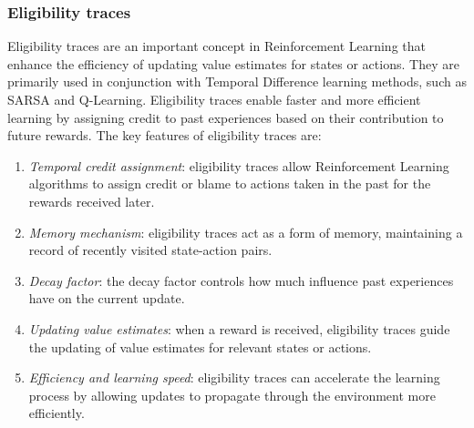 \subsubsection{Eligibility traces}
Eligibility traces are an important concept in Reinforcement Learning that enhance the efficiency of updating value estimates for states or actions. 
They are primarily used in conjunction with Temporal Difference learning methods, such as SARSA and Q-Learning. 
Eligibility traces enable faster and more efficient learning by assigning credit to past experiences based on their contribution to future rewards.
The key features of eligibility traces are:
\begin{enumerate}
    \item \textit{Temporal credit assignment}: eligibility traces allow Reinforcement Learning algorithms to assign credit or blame to actions taken in the past for the rewards received later.
    \item \textit{Memory mechanism}: eligibility traces act as a form of memory, maintaining a record of recently visited state-action pairs.
    \item \textit{Decay factor}: the decay factor controls how much influence past experiences have on the current update.
    \item \textit{Updating value estimates}: when a reward is received, eligibility traces guide the updating of value estimates for relevant states or actions.
    \item \textit{Efficiency and learning speed}: eligibility traces can accelerate the learning process by allowing updates to propagate through the environment more efficiently. 
\end{enumerate}

